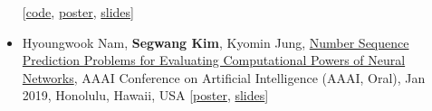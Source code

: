 \documentclass[12pt]{article}
\begin{document}
\begin{itemize}
[\href{https://github.com/SegwangKim/neural-seq2grid-module}{code}, \href{https://segwangkim.github.io/pdfs/poster_AAAI21.pdf}{poster}, \href{https://www.slideshare.net/segwangkim/seq2grid-aaai-2021}{slides}]
\item Hyoungwook Nam, \textbf{Segwang Kim}, Kyomin Jung, \href{https://ojs.aaai.org//index.php/AAAI/article/view/4387}{Number Sequence Prediction Problems for Evaluating Computational Powers of Neural Networks}, AAAI Conference on Artificial Intelligence (AAAI, Oral), Jan 2019, Honolulu, Hawaii, USA
[\href{https://segwangkim.github.io/pdfs/poster_AAAI19.pdf}{poster}, \href{https://segwangkim.github.io/pdfs/slides_AAAI19.pdf}{slides}]


\end{itemize}

\vspace{0.2in} %









\end{document}
